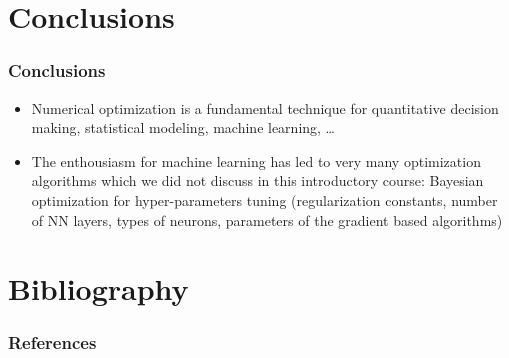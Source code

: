 \documentclass[12pt]{beamer}
\begin{document}
\section*{Conclusions}

\begin{frame}
\frametitle{Conclusions}
\begin{itemize}
\item Numerical optimization is a fundamental technique for quantitative decision making, statistical modeling, machine learning, \ldots
\item The enthousiasm for machine learning has led to very many optimization algorithms which we did not discuss in this introductory course: Bayesian optimization for hyper-parameters tuning (regularization constants, number of NN layers, types of neurons, parameters of the gradient based algorithms)
\end{itemize}
\end{frame}

\section{Bibliography}

\begin{frame}[allowframebreaks]
\frametitle{References}
\scriptsize
%   
   
   
\end{frame}
\end{document}
